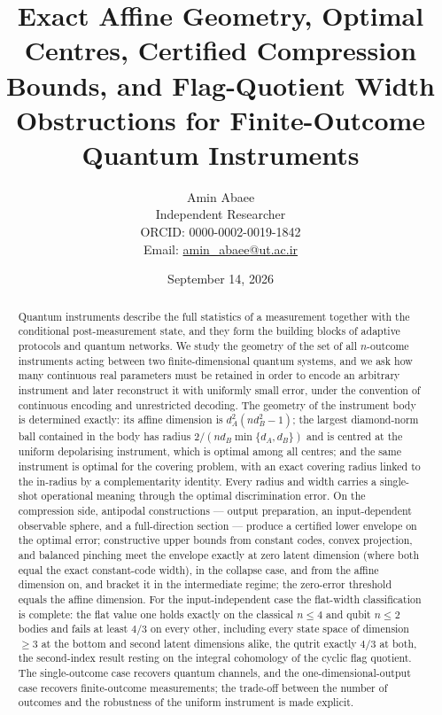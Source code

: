 \documentclass[11pt,a4paper]{article}
\title{\bf Exact Affine Geometry, Optimal Centres, Certified Compression Bounds, and Flag-Quotient Width Obstructions for Finite-Outcome Quantum Instruments}
\author{Amin Abaee\\
\small Independent Researcher\\
\small ORCID: 0000-0002-0019-1842\\
\small Email: \href{mailto:amin\_abaee@ut.ac.ir}{amin\_abaee@ut.ac.ir}}
\date{September 14, 2026}
\begin{document}
\maketitle

\begin{abstract}
Quantum instruments describe the full statistics of a measurement together with the conditional post-measurement state, and they form the building blocks of adaptive protocols and quantum networks. We study the geometry of the set of all $n$-outcome instruments acting between two finite-dimensional quantum systems, and we ask how many continuous real parameters must be retained in order to encode an arbitrary instrument and later reconstruct it with uniformly small error, under the convention of continuous encoding and unrestricted decoding. The geometry of the instrument body is determined exactly: its affine dimension is $d_A^2(nd_B^2-1)$; the largest diamond-norm ball contained in the body has radius $2/(nd_B\min\{d_A,d_B\})$ and is centred at the uniform depolarising instrument, which is optimal among all centres; and the same instrument is optimal for the covering problem, with an exact covering radius linked to the in-radius by a complementarity identity. Every radius and width carries a single-shot operational meaning through the optimal discrimination error. On the compression side, antipodal constructions --- output preparation, an input-dependent observable sphere, and a full-direction section --- produce a certified lower envelope on the optimal error; constructive upper bounds from constant codes, convex projection, and balanced pinching meet the envelope exactly at zero latent dimension (where both equal the exact constant-code width), in the collapse case, and from the affine dimension on, and bracket it in the intermediate regime; the zero-error threshold equals the affine dimension. For the input-independent case the flat-width classification is complete: the flat value one holds exactly on the classical $n\le4$ and qubit $n\le2$ bodies and fails at least $4/3$ on every other, including every state space of dimension $\ge3$ at the bottom and second latent dimensions alike, the qutrit exactly $4/3$ at both, the second-index result resting on the integral cohomology of the cyclic flag quotient. The single-outcome case recovers quantum channels, and the one-dimensional-output case recovers finite-outcome measurements; the trade-off between the number of outcomes and the robustness of the uniform instrument is made explicit.
\end{abstract}
\end{document}
